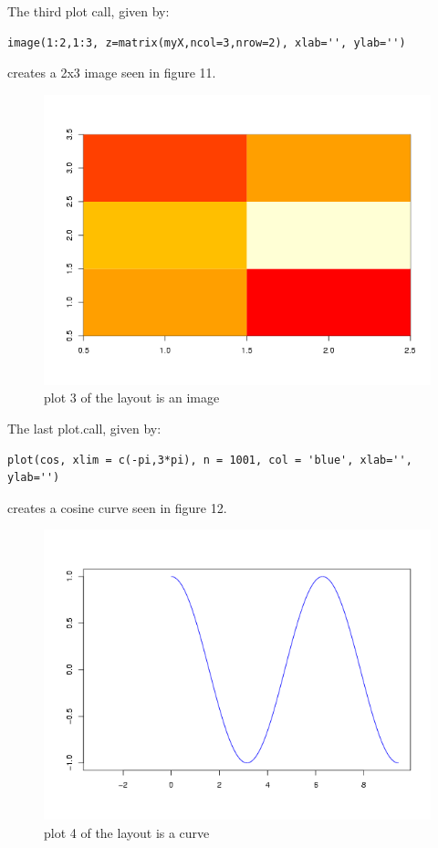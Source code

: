 \documentclass[]{article}
\begin{document}
\indent The third plot call, given by:
\begin{verbatim}
image(1:2,1:3, z=matrix(myX,ncol=3,nrow=2), xlab='', ylab='')
\end{verbatim}
creates a 2x3 image seen in figure 11.


\begin{center}
\begin{figure}
\includegraphics{image}
\caption{plot 3 of the layout is an image}
\end{figure}
\end{center}


\indent The last plot.call, given by: 
\begin{verbatim}
plot(cos, xlim = c(-pi,3*pi), n = 1001, col = 'blue', xlab='', ylab='')
\end{verbatim}
creates a cosine curve seen in figure 12.
 
\begin{center}
\begin{figure}
\includegraphics{sinCurve}
\caption{plot 4 of the layout is a curve}
\end{figure}
\end{center}
\end{document}
